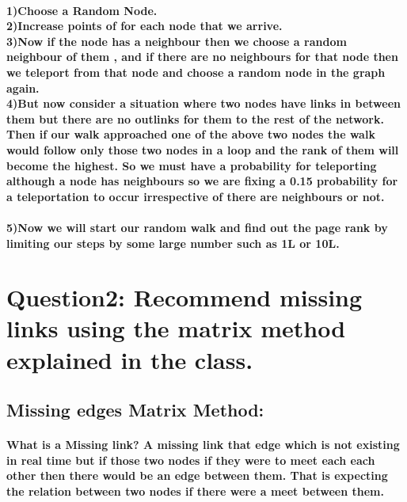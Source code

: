 \documentclass{article}
\begin{document}
\paragraph{1)Choose a Random Node.\\2)Increase points of for each node that we arrive.\\3)Now if the node has a neighbour then we choose a random neighbour of them , and if there are no neighbours for that node then we teleport from that node and choose a random node in the graph again.\\4)But now consider a situation where two nodes have links in between them but there are no outlinks for them to the rest of the network. Then if our walk approached one of the above two nodes the walk would follow only those two nodes in a loop and the rank of them will become the highest. So we must have a probability for teleporting although a node has neighbours so we are fixing a 0.15 probability for a teleportation to occur irrespective of there are neighbours or not.}
\paragraph{5)Now we will start our random walk and find out the page rank by limiting our steps by some large number such as 1L or 10L.}
\newpage
\section*{Question2: Recommend missing links using the matrix method explained in the class.}
\subsection*{Missing edges Matrix Method:}
\paragraph{What is a Missing link? A missing link that edge which is not existing in real time but if those two nodes if they were to meet each each other then there would be an edge between them. That is expecting the relation between two nodes if there were a meet between them.}
\end{document}
